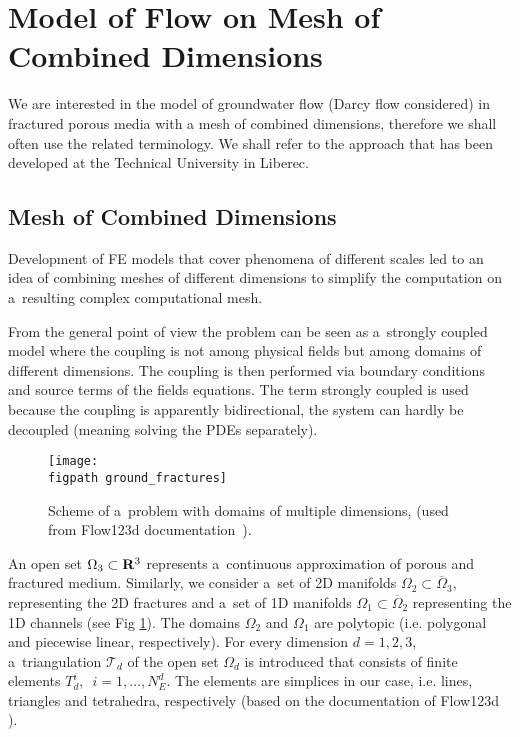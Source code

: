\documentclass[dvipsnames,FM,Dis]{tulthesis}
\newcommand{\figpath}{figures/}
\begin{document}



\section{Model of Flow on Mesh of Combined Dimensions} \label{sec:soa_model_combined}

We are interested in the model of groundwater flow (Darcy flow considered) in fractured porous 
media with a mesh of combined dimensions, therefore we shall often use the related terminology.
We shall refer to the approach that has been developed at the Technical
University in Liberec. 

\subsection{Mesh of Combined Dimensions}
Development of FE models that cover phenomena of different scales led to an idea of combining meshes of
different dimensions to simplify the computation on a~resulting complex computational mesh.

From the general point of view the problem can be seen as a~strongly coupled model where the coupling is not
among physical fields but among domains of different dimensions. The coupling is then performed via boundary
conditions and source terms of the fields equations. The term strongly coupled is used because the coupling 
is apparently bidirectional, the system can hardly be decoupled (meaning solving the PDEs separately). 

\begin{figure}[h]
\centering
\texttt{[image: \\figpath ground\_fractures]}
\caption{
    \label{fig:multi-dim}
    Scheme of a~problem with domains of multiple dimensions, (used from Flow123d documentation~\cite{flow123d_doc_2015}).
}
\end{figure}

An open set $\Omega_{3} \subset {\rm\bf R}^3$ represents a~continuous approximation of porous and fractured medium.
Similarly, we consider a~set of 2D manifolds $\Omega_2\subset\overline\Omega_3$, representing the 2D fractures and a~set of 1D manifolds $\Omega_1\subset \overline\Omega_2$ 
representing the 1D channels (see Fig \ref{fig:multi-dim}).
The domains $\Omega_2$ and $\Omega_1$ are polytopic (i.e. polygonal and piecewise linear, respectively).
For every dimension $d=1,2,3$, a~triangulation $\mathcal{T}_{d}$ of the open set $\Omega_d$
is introduced that consists of finite elements $T_{d}^{i},$\ $i = 1,\dots,N_{E}^{d}$.
The elements are simplices in our case, i.e. lines, triangles and tetrahedra, respectively 
(based on the documentation of Flow123d \cite{flow123d_doc_2015}).
\end{document}

